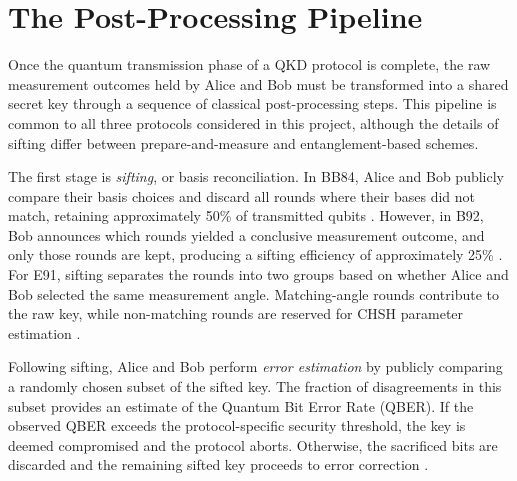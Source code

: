 %
%



\section{The Post-Processing Pipeline}

Once the quantum transmission phase of a QKD protocol is complete, the raw measurement outcomes held by Alice and Bob must be transformed into a shared secret key through a sequence of classical post-processing steps. This pipeline is common to all three protocols considered in this project, although the details of sifting differ between prepare-and-measure and entanglement-based schemes.

The first stage is \textit{sifting}, or basis reconciliation. In BB84, Alice and Bob publicly compare their basis choices and discard all rounds where their bases did not match, retaining approximately 50\% of transmitted qubits \cite{BB84}. However, in B92, Bob announces which rounds yielded a conclusive measurement outcome, and only those rounds are kept, producing a sifting efficiency of approximately 25\% \cite{B92}. For E91, sifting separates the rounds into two groups based on whether Alice and Bob selected the same measurement angle. Matching-angle rounds contribute to the raw key, while non-matching rounds are reserved for CHSH parameter estimation \cite{E91}.

Following sifting, Alice and Bob perform \textit{error estimation} by publicly comparing a randomly chosen subset of the sifted key. The fraction of disagreements in this subset provides an estimate of the Quantum Bit Error Rate (QBER). If the observed QBER exceeds the protocol-specific security threshold, the key is deemed compromised and the protocol aborts. Otherwise, the sacrificed bits are discarded and the remaining sifted key proceeds to error correction \cite{Scarani2009}.

